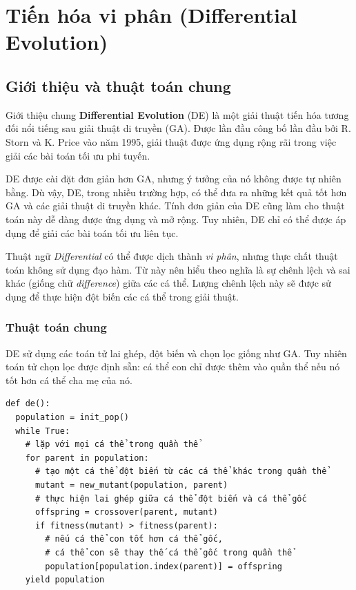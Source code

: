 \section{Tiến hóa vi phân (Differential Evolution)} %
\label{sec:Tiến hóa vi phân (Differential Evolution)}

\subsection{Giới thiệu và thuật toán chung} %
\label{sub:Giới thiệu và thuật toán chung}

\begin{frame}{Giới thiệu chung}
  \textbf{Differential Evolution} (DE) là một giải thuật tiến hóa tương đối nổi
  tiếng sau giải thuật di truyền (GA). Được lần đầu công bố lần đầu bởi R. Storn
  và K. Price vào năm 1995, giải thuật được ứng dụng rộng rãi trong việc giải
  các bài toán tối ưu phi tuyến.

  DE được cài đặt đơn giản hơn GA, nhưng ý tưởng của nó không được tự nhiên
  bằng. Dù vậy, DE, trong nhiều trường hợp, có thể đưa ra những kết quả tốt hơn
  GA và các giải thuật di truyền khác. Tính đơn giản của DE cũng làm cho thuật
  toán này dễ dàng được ứng dụng và mở rộng. Tuy nhiên, DE chỉ có thể được áp
  dụng để giải các bài toán tối ưu liên tục.

  Thuật ngữ \textit{Differential} có thể được dịch thành \textit{vi phân}, nhưng
  thực chất thuật toán không sử dụng đạo hàm. Từ này nên hiểu theo nghĩa là sự
  chênh lệch và sai khác (giống chữ \textit{difference}) giữa các cá thể.
  Lượng chênh lệch này sẽ được sử dụng để thực hiện đột biến các cá thể trong giải
  thuật.
\end{frame}

\begin{frame}[fragile]
\frametitle{Thuật toán chung}
  DE sử dụng các toán tử lai ghép, đột biến và chọn lọc giống như GA. Tuy nhiên
  toán tử chọn lọc được định sẵn: cá thể con chỉ được thêm vào quần thể nếu nó
  tốt hơn cá thể cha mẹ của nó.
  \begin{verbatim}
def de():
  population = init_pop()
  while True:
    # lặp với mọi cá thể trong quần thể
    for parent in population:
      # tạo một cá thể đột biến từ các cá thể khác trong quần thể
      mutant = new_mutant(population, parent)
      # thực hiện lai ghép giữa cá thể đột biến và cá thể gốc
      offspring = crossover(parent, mutant)
      if fitness(mutant) > fitness(parent):
        # nếu cá thể con tốt hơn cá thể gốc,
        # cá thể con sẽ thay thế cá thể gốc trong quần thể
        population[population.index(parent)] = offspring
    yield population
\end{verbatim}
\end{frame}

